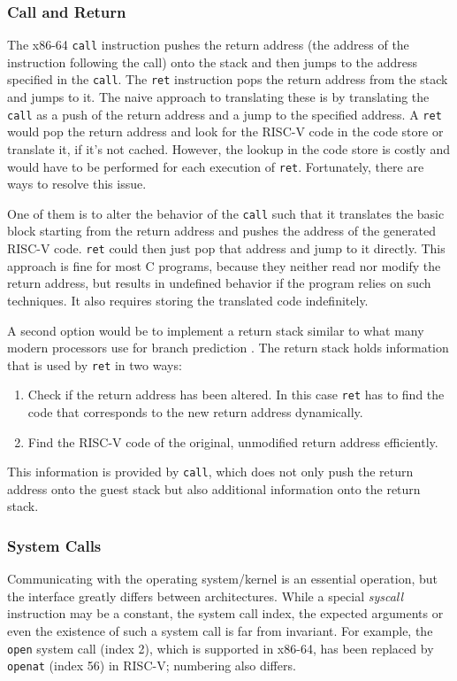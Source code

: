 	\subsubsection{Call and Return}
		The x86-64 \texttt{call} instruction pushes the return address (the address of the instruction following the call) onto the stack and then jumps to the address specified in the \texttt{call}. The \texttt{ret} instruction pops the return address from the stack and jumps to it. The naive approach to translating these is by translating the \texttt{call} as a push of the return address and a jump to the specified address. A \texttt{ret} would pop the return address and look for the RISC-V code in the code store or translate it, if it's not cached. However, the lookup in the code store is costly and would have to be performed for each execution of \texttt{ret}. Fortunately, there are ways to resolve this issue. 
		
		One of them is to alter the behavior of the \texttt{call} such that it translates the basic block starting from the return address and pushes the address of the generated RISC-V code. \texttt{ret} could then just pop that address and jump to it directly. This approach is fine for most C programs, because they neither read nor modify the return address, but results in undefined behavior if the program relies on such techniques. It also requires storing the translated code indefinitely.
		
		A second option would be to implement a return stack similar to what many modern processors use for branch prediction \cite{arm-technical-reference-manual}. The return stack holds information that is used by \texttt{ret} in two ways:
		\begin{enumerate}
			\item Check if the return address has been altered. In this case \texttt{ret} has to find the code that corresponds to the new return address dynamically.
			\item Find the RISC-V code of the original, unmodified return address efficiently.
		\end{enumerate}
		This information is provided by \texttt{call}, which does not only push the return address onto the guest stack but also additional information onto the return stack.
		
	\subsubsection{System Calls}
	\label{approach_syscalls}
		Communicating with the operating system/kernel is an essential operation, but the interface greatly differs between architectures. While a special \emph{syscall} instruction may be a constant, the system call index, the expected arguments or even the existence of such a system call is far from invariant. For example, the \texttt{open} system call (index 2), which is supported in x86-64, has been replaced by \texttt{openat} (index 56) in RISC-V; numbering also differs.
	
